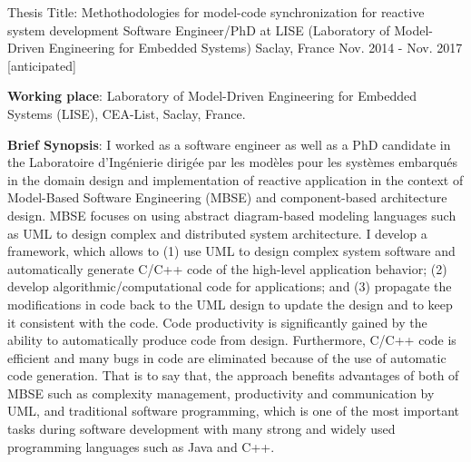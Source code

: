 


\begin{cventries}


\cventry
{Thesis Title: Methothodologies for model-code synchronization for reactive system development} %
{Software Engineer/PhD at LISE (Laboratory of Model-Driven Engineering for Embedded Systems)} %
{Saclay, France} %
{Nov. 2014 - Nov. 2017 [anticipated]} %
{ %
	\begin{cvitems}
		\item {\textbf{Working place}: Laboratory of Model-Driven Engineering for Embedded Systems (LISE), CEA-List, Saclay, France.}	
		\item {\textbf{Brief Synopsis}: I worked as a software engineer as well as a PhD candidate in the Laboratoire d'Ingénierie dirigée par les modèles pour les systèmes embarqués in the domain design and implementation of reactive application in the context of Model-Based Software Engineering (MBSE) and component-based architecture design. 
		MBSE focuses on using abstract diagram-based modeling languages such as UML to design complex and distributed system architecture. 
		I develop a framework, which allows to (1) use UML to design complex system software and automatically generate C/C++ code of the high-level application behavior; (2) develop algorithmic/computational code for applications; and (3) propagate the modifications in code back to the UML design to update the design and to keep it consistent with the code. 
		Code productivity is significantly gained by the ability to automatically produce code from design. Furthermore, C/C++ code is efficient and many bugs in code are eliminated because of the use of automatic code generation. That is to say that, the approach benefits advantages of both of MBSE such as complexity management, productivity  and communication by UML, and traditional software programming, which is one of the most important tasks during software development with many strong and widely used programming languages such as Java and C++.  
}
\end{cvitems}}
\end{cventries}

